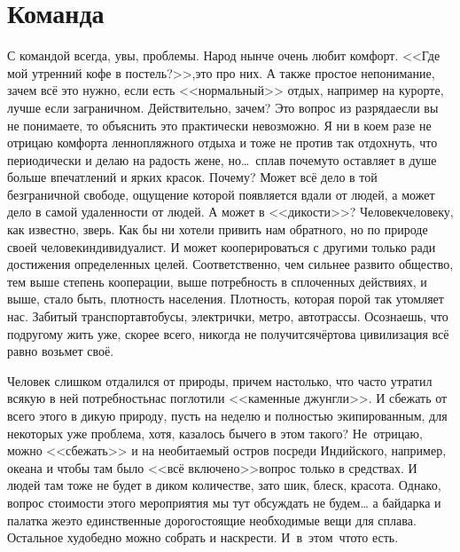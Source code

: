 \chapter{Команда} 

С командой всегда, увы, проблемы. Народ нынче очень любит комфорт. <<Где мой утренний кофе в постель?>>,\mdash это про них. А также простое непонимание, зачем всё это нужно, если есть <<нормальный>> отдых, например на курорте, лучше если заграничном. Действительно, зачем? Это вопрос из разряда\mdash если вы не понимаете, то объяснить это практически невозможно. Я ни в коем разе не отрицаю комфорта ленно\sdash пляжного отдыха и тоже не против так отдохнуть, что периодически и делаю на радость жене, но\ldots~сплав почему\sdash то оставляет в душе больше впечатлений и ярких красок. Почему? Может всё дело в той безграничной свободе, ощущение которой появляется вдали от людей, а может дело в самой удаленности от людей. А может в <<дикости>>? Человек\ndash человеку, как известно, зверь. Как бы ни хотели привить нам обратного, но по природе своей человек\mdash индивидуалист. И может кооперироваться с другими только ради достижения определенных целей. Соответственно, чем сильнее развито общество, тем выше степень кооперации, выше потребность в сплоченных действиях, и выше, стало быть, плотность населения. Плотность, которая порой так утомляет нас. Забитый транспорт\mdash автобусы, электрички, метро, автотрассы. Осознаешь, что по\sdash другому жить уже, скорее всего, никогда не получится\mdash чёртова цивилизация всё равно возьмет своё. ­

Человек слишком отдалился от природы, причем настолько, что часто утратил всякую в ней потребность\mdash нас поглотили <<каменные джунгли>>. И сбежать от всего этого в дикую природу, пусть на неделю и полностью экипированным, для некоторых уже проблема, хотя, казалось бы\mdash чего в этом такого? Не~отрицаю, можно <<сбежать>> и на необитаемый остров посреди Индийского, например, океана и чтобы там было <<всё включено>>\mdash вопрос только в средствах. И людей там тоже не будет в диком количестве, зато шик, блеск, красота. Однако, вопрос стоимости этого мероприятия мы тут обсуждать не будем… а байдарка и палатка же\mdash это единственные дорогостоящие необходимые вещи для сплава. Остальное худо\sdash бедно можно собрать и наскрести. И~в~этом~что\sdash то есть. 

